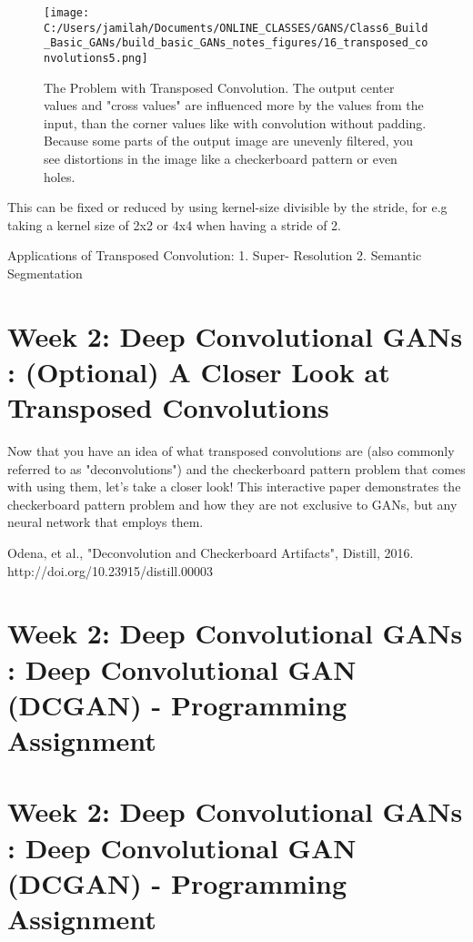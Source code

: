 \documentclass[11pt, onecolumn]{article}
\begin{document}
\begin{itemize}
\begin{figure}[htp]
\begin{center}
\texttt{[image: C:/Users/jamilah/Documents/ONLINE\_CLASSES/GANS/Class6\_Build\_Basic\_GANs/build\_basic\_GANs\_notes\_figures/16\_transposed\_convolutions5.png]}
\end{center}
\caption{The Problem with Transposed Convolution. The output center values and "cross values" are influenced more by the values from the input, than the corner values like with convolution without padding.  Because some parts of the output image are unevenly filtered, you see distortions in the image like a checkerboard pattern or even holes.}
\label{16_transposed_convolutions5}
\end{figure}

This can be fixed or reduced by using kernel-size divisible by the stride, for e.g taking a kernel size of 2x2 or 4x4 when having a stride of 2.

Applications of Transposed Convolution:
1. Super- Resolution
2. Semantic Segmentation


\section{Week 2: Deep Convolutional GANs : (Optional) A Closer Look at Transposed Convolutions}
Now that you have an idea of what transposed convolutions are (also commonly referred to as "deconvolutions") and the checkerboard pattern problem that comes with using them, let's take a closer look! This interactive paper demonstrates the checkerboard pattern problem and how they are not exclusive to GANs, but any neural network that employs them.

Odena, et al., "Deconvolution and Checkerboard Artifacts", Distill, 2016. http://doi.org/10.23915/distill.00003

\section{Week 2: Deep Convolutional GANs : Deep Convolutional GAN (DCGAN) - Programming Assignment}


\section{Week 2: Deep Convolutional GANs : Deep Convolutional GAN (DCGAN) - Programming Assignment}



\end{itemize}
\end{document}

